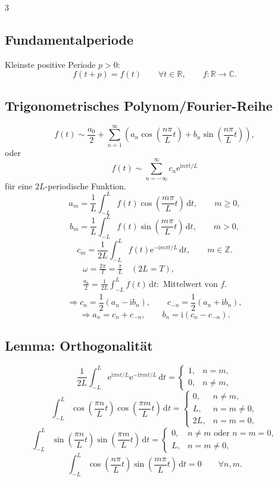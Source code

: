 \documentclass[a4paper,landscape]{article}
\newcommand{\C}{\mathbb C}
\newcommand{\R}{\mathbb R}
\newcommand{\Z}{\mathbb Z}
\newcommand{\dd}{\,\mathrm d}
\newcommand{\ee}{\mathrm e}
\newcommand{\ii}{\mathrm i}
\begin{document}
\begin{multicols*}{3}
\subsection*{Fundamentalperiode}
Kleinste positive Periode $p>0$:
\[
f(t+p)=f(t)\qquad \forall t\in\R,\qquad f:\R\to\C.
\]

\subsection*{Trigonometrisches Polynom/Fourier-Reihe}
\[
f(t)\sim \frac{a_0}{2}+\sum_{n=1}^{\infty}\left(a_n\cos\left(\frac{n\pi}{L}t\right)+b_n\sin\left(\frac{n\pi}{L}t\right)\right),
\]
oder
\[
f(t)\sim\sum_{n=-\infty}^{\infty}c_n\ee^{\ii n\pi t/L}
\]
für eine $2L$-periodische Funktion.
\[
a_m=\frac1L\int_{-L}^{L}f(t)\cos\left(\frac{m\pi}{L}t\right)\dd t,\qquad m\ge0,
\]
\[
b_m=\frac1L\int_{-L}^{L}f(t)\sin\left(\frac{m\pi}{L}t\right)\dd t,\qquad m>0,
\]
\[
c_m=\frac1{2L}\int_{-L}^{L}f(t)\ee^{-\ii m\pi t/L}\dd t,\qquad m\in\Z.
\]
\[
\begin{gathered}
\omega=\frac{2\pi}{T}=\frac{\pi}{L}\quad(2L=T),\\
\frac{a_0}{2}=\frac1{2L}\int_{-L}^{L}f(t)\dd t:
\text{ Mittelwert von }f.
\end{gathered}
\]
\[
\Rightarrow c_n=\frac12(a_n-\ii b_n),\qquad c_{-n}=\frac12(a_n+\ii b_n),
\]
\[
\Rightarrow a_n=c_n+c_{-n},\qquad b_n=\ii(c_n-c_{-n}).
\]

\subsection*{Lemma: Orthogonalität}
\[
\frac1{2L}\int_{-L}^{L}\ee^{\ii\pi n t/L}\ee^{-\ii\pi m t/L}\dd t=
\begin{cases}1,&n=m,\\0,&n\ne m,
\end{cases}
\]
\[
\int_{-L}^{L}\cos\left(\frac{\pi n}{L}t\right)\cos\left(\frac{\pi m}{L}t\right)\dd t=
\begin{cases}0,&n\ne m,\\L,&n=m\ne0,\\2L,&n=m=0,
\end{cases}
\]
\[
\int_{-L}^{L}\sin\left(\frac{\pi n}{L}t\right)\sin\left(\frac{\pi m}{L}t\right)\dd t=
\begin{cases}0,&n\ne m\text{ oder }n=m=0,\\L,&n=m\ne0,
\end{cases}
\]
\[
\int_{-L}^{L}\cos\left(\frac{n\pi}{L}t\right)\sin\left(\frac{m\pi}{L}t\right)\dd t=0\qquad\forall n,m.
\]


\end{multicols*}
\end{document}
